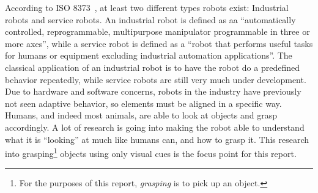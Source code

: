 According to ISO 8373~\cite{iso8373}, at least two different types robots exist:
Industrial robots and service robots.
An industrial robot is defined as aa ``automatically controlled, reprogrammable, multipurpose manipulator programmable in three or more axes'',
while a service robot is defined as a ``robot that performs useful tasks for humans or equipment excluding industrial automation applications''.
The classical application of an industrial robot is to have the robot do a predefined behavior repeatedly,
while service robots are still very much under development.
Due to hardware and software concerns, robots in the industry have previously not seen adaptive behavior,
so elements must be aligned in a specific way. Humans, and indeed most animals, are able to look at objects and grasp accordingly.
A lot of research is going into making the robot able to understand what it is ``looking'' at much like humans can,
and how to grasp it. This research into grasping\footnote{For the purposes of this report, \emph{grasping} is to pick up an object.} objects using only visual cues is the focus point for this report.
